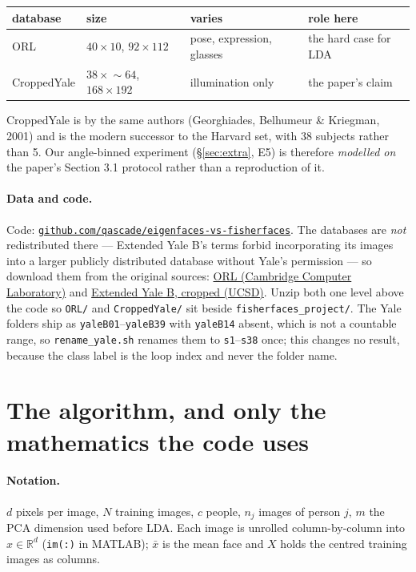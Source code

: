\documentclass[11pt]{article}
\begin{document}
\begin{center}
\small
\begin{tabular}{lllp{3.3cm}}
\toprule
database & size & varies & role here \\
\midrule
ORL & $40\times10$, $92\!\times\!112$ & pose, expression, glasses & the hard case for LDA \\
CroppedYale & $38\times\!\sim\!64$, $168\!\times\!192$ & illumination only & the paper's claim \\
\bottomrule
\end{tabular}
\end{center}

CroppedYale is by the same authors (Georghiades, Belhumeur \& Kriegman, 2001)
and is the modern successor to the Harvard set, with 38 subjects rather than 5.
Our angle-binned experiment (\S\ref{sec:extra}, E5) is therefore
\emph{modelled on} the paper's Section 3.1 protocol rather than a reproduction
of it.

\paragraph{Data and code.} Code:
\href{https://github.com/qascade/eigenfaces-vs-fisherfaces}{\texttt{github.com/qascade/eigenfaces-vs-fisherfaces}}.
The databases are \emph{not} redistributed there --- Extended Yale B's terms
forbid incorporating its images into a larger publicly distributed database
without Yale's permission --- so download them from the original sources:
\href{https://www.cl.cam.ac.uk/research/dtg/attarchive/facedatabase.html}{ORL
(Cambridge Computer Laboratory)} and
\href{https://datarepo.eng.ucsd.edu/visiondata/iskwak/public_html/ExtYaleDatabase/ExtYaleB.html}{Extended
Yale B, cropped (UCSD)}. Unzip both one level above the code so \texttt{ORL/}
and \texttt{CroppedYale/} sit beside \texttt{fisherfaces\_project/}. The Yale
folders ship as \texttt{yaleB01}--\texttt{yaleB39} with \texttt{yaleB14}
absent, which is not a countable range, so \texttt{rename\_yale.sh} renames
them to \texttt{s1}--\texttt{s38} once; this changes no result, because the
class label is the loop index and never the folder name.

\section{The algorithm, and only the mathematics the code uses}

\paragraph{Notation.} $d$ pixels per image, $N$ training images, $c$ people,
$n_j$ images of person $j$, $m$ the PCA dimension used before LDA. Each image
is unrolled column-by-column into $x\in\mathbb{R}^d$ (\texttt{im(:)} in
MATLAB); $\bar{x}$ is the mean face and $X$ holds the centred training images
as columns.
\end{document}
